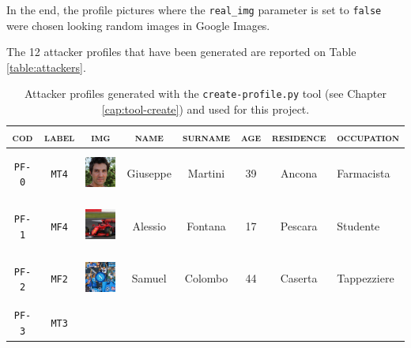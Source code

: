 \par \noindent In the end, the profile pictures where the \texttt{real\_img} parameter is set to \texttt{false} were chosen looking random images in Google Images.
\par \noindent The 12 attacker profiles that have been generated are reported on Table \ref{table:attackers}.
\begin{table}[H]
	\centering
	\caption{Attacker profiles generated with the \texttt{create-profile.py} tool (see Chapter \ref{cap:tool-create}) and used for this project.}
\begin{tabular}[c]{ |c|c|m{1.5cm}|c|c|c|c|m{1.85cm}| } 
	\hline
	\cellcolor[HTML]{b0d7ff}\textsc{cod} & 
	\cellcolor[HTML]{b0d7ff}\textsc{label} & 
	\multicolumn{1}{|c|}{\cellcolor[HTML]{b0d7ff}\textsc{img}}&
	\cellcolor[HTML]{b0d7ff}\textsc{name} & 
	\cellcolor[HTML]{b0d7ff}\textsc{surname} &
	\cellcolor[HTML]{b0d7ff}\textsc{age} &
	\cellcolor[HTML]{b0d7ff}\textsc{residence}	&
	\cellcolor[HTML]{b0d7ff}\textsc{occupation}	\\
	\hline
	\cellcolor[HTML]{b0d7ff}\texttt{PF-0}&\cellcolor[HTML]{e6f2ff}\texttt{MT4}&	
	\vspace{.15cm}
	\includegraphics[height=1.5cm]{immagini/MT4.jpg}
	&Giuseppe&Martini&39&Ancona&Farmacista\\
	\hline
	\cellcolor[HTML]{b0d7ff}\texttt{PF-1}&\cellcolor[HTML]{e6f2ff}\texttt{MF4}&	
	\vspace{.15cm}
	\includegraphics[height=1.5cm]{immagini/MF4.jpg}
	&Alessio&Fontana&17&Pescara&Studente\\	
	\hline 
	\cellcolor[HTML]{b0d7ff}\texttt{PF-2}&\cellcolor[HTML]{e6f2ff}\texttt{MF2}&	
	\vspace{.15cm}
	\includegraphics[height=1.5cm]{immagini/MF2.jpg}
	&Samuel&Colombo&44&Caserta&Tappezziere\\
	\hline
	\cellcolor[HTML]{b0d7ff}\texttt{PF-3}&\cellcolor[HTML]{e6f2ff}\texttt{MT3}&	

\end{tabular}
\end{table}
